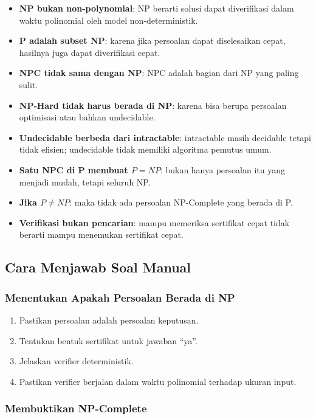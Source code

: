 \begin{itemize}
    \item \textbf{NP bukan non-polynomial}: NP berarti solusi dapat diverifikasi dalam waktu polinomial oleh model non-deterministik.
    \item \textbf{P adalah subset NP}: karena jika persoalan dapat diselesaikan cepat, hasilnya juga dapat diverifikasi cepat.
    \item \textbf{NPC tidak sama dengan NP}: NPC adalah bagian dari NP yang paling sulit.
    \item \textbf{NP-Hard tidak harus berada di NP}: karena bisa berupa persoalan optimisasi atau bahkan undecidable.
    \item \textbf{Undecidable berbeda dari intractable}: intractable masih decidable tetapi tidak efisien; undecidable tidak memiliki algoritma pemutus umum.
    \item \textbf{Satu NPC di P membuat $P=NP$}: bukan hanya persoalan itu yang menjadi mudah, tetapi seluruh NP.
    \item \textbf{Jika $P\ne NP$}: maka tidak ada persoalan NP-Complete yang berada di P.
    \item \textbf{Verifikasi bukan pencarian}: mampu memeriksa sertifikat cepat tidak berarti mampu menemukan sertifikat cepat.
\end{itemize}

\subsection{Cara Menjawab Soal Manual}

\subsubsection{Menentukan Apakah Persoalan Berada di NP}

\begin{enumerate}
    \item Pastikan persoalan adalah persoalan keputusan.
    \item Tentukan bentuk sertifikat untuk jawaban ``ya''.
    \item Jelaskan verifier deterministik.
    \item Pastikan verifier berjalan dalam waktu polinomial terhadap ukuran input.
\end{enumerate}

\subsubsection{Membuktikan NP-Complete}

